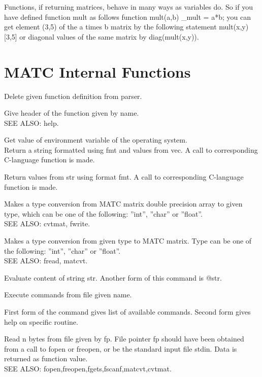Functions, if returning matrices, behave in many ways as variables do. So if you have defined function mult as follows 
\ttbegin
function mult(a,b)
{
   _mult = a*b;
}
\ttend
you can get element (3,5) of the a times b matrix by the following statement 
\ttbegin
mult(x,y)[3,5]
\ttend
or diagonal values of the same matrix by 
\ttbegin
diag(mult(x,y)).
\ttend


\section{MATC Internal Functions}

\sifbegin
{}
Delete given function definition from parser. 

Give header of the function given by name. \\
SEE ALSO: help. 

Get value of environment variable of the operating system. \\

Return a string formatted using fmt and values from vec. A call to corresponding C-language function is made. 

Return values from str using format fmt. A call to corresponding C-language function is made. 

Makes a type conversion from MATC matrix double precision array to given type, 
which can be one of the following: ''int'', ''char'' or ''float''. \\
SEE ALSO: cvtmat, fwrite. 

Makes a type conversion from given type to MATC matrix. Type can be one of the following: ''int'', ''char'' or ''float''. \\
SEE ALSO: fread, matcvt. 

Evaluate content of string str. Another form of this command is @str. 

Execute commands from file given name. 

First form of the command gives list of available commands. Second form gives help on specific routine. 

Read n bytes from file given by fp. File pointer fp should have been obtained from a call to fopen or freopen, or be the standard input file stdin. Data is returned as function value.  \\
SEE ALSO: fopen,freopen,fgets,fscanf,matcvt,cvtmat. 

